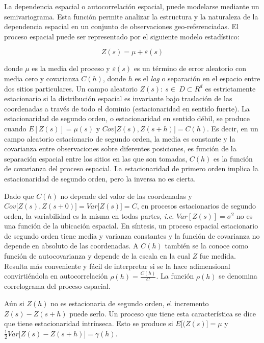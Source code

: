 \documentclass[11pt,b5paper,]{krantz}
\begin{document}
La dependencia espacial o autocorrelación espacial, puede modelarse mediante un semivariograma. Esta función permite analizar la estructura y la naturaleza de la dependencia espacial en un conjunto de observaciones geo-referenciadas. El proceso espacial puede ser representado por el siguiente modelo estadístico:

\[Z\left(s\right)=\mu+\varepsilon\left(s\right)\]

donde \(\mu\) es la media del proceso y \(\varepsilon\left(s\right)\) es un término de error aleatorio con media cero y covarianza \(C(h)\), donde \(h\) es el \emph{lag} o separación en el espacio entre dos sitios particulares. Un campo aleatorio \({Z(s):\ s\in\ D\subset R^d}\) es estrictamente estacionario si la distribución espacial es invariante bajo traslación de las coordenadas a través de todo el dominio (estacionaridad en sentido fuerte). La estacionaridad de segundo orden, o estacionaridad en sentido débil, se produce cuando \(E\left[Z\left(s\right)\right]=\mu\left(s\right)\) y \(Cov\big[Z(s),Z(s+h)\big]=C(h)\). Es decir, en un campo aleatorio estacionario de segundo orden, la media es constante y la covarianza entre observaciones sobre diferentes posiciones, es función de la separación espacial entre los sitios en las que son tomadas, \(C(h)\) es la función de covarianza del proceso espacial. La estacionaridad de primero orden implica la estacionaridad de segundo orden, pero la inversa no es cierta.

Dado que \(C(h)\) no depende del valor de las coordenadas y \(Cov\big[Z(s),Z(s+0)\big]= Var \big[Z(s)\big]=C\), en procesos estacionarios de segundo orden, la variabilidad es la misma en todas partes, \emph{i.e.} \(Var [Z(s)]=\sigma^2\) no es una función de la ubicación espacial. En síntesis, un proceso espacial estacionario de segundo orden tiene media y varianza constantes y la función de covarianza no depende en absoluto de las coordenadas. A \(C\left(h\right)\) también se la conoce como función de autocovarianza y depende de la escala en la cual \(Z\) fue medida. Resulta más conveniente y fácil de interpretar si se la hace adimensional convirtiéndola en autocorrelación \(\rho\left(h\right)=\frac{C(h)}{C}\). La función \(\rho\left(h\right)\) se denomina correlograma del proceso espacial.

Aún si \(Z(h)\) no es estacionaria de segundo orden, el incremento \(Z(s)-Z(s+h)\) puede serlo. Un proceso que tiene esta característica se dice que tiene estacionaridad intrínseca. Esto se produce si \(E\big[(Z(s)\big]=\mu\) y \(\frac{1}{2}Var\big[Z(s)-Z(s+h)\big]=\gamma(h)\).
\end{document}
